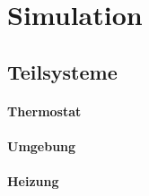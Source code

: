 \section{Simulation}
\label{sec:Simulation}

\subsection{Teilsysteme}
\label{subsec:Teilsysteme}

\paragraph{Thermostat}

\paragraph{Umgebung}

\paragraph{Heizung}

